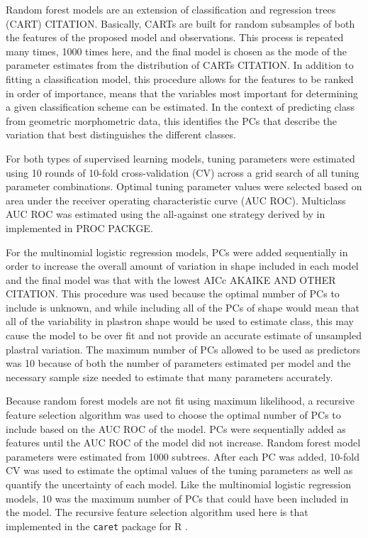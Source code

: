 \documentclass[12pt]{article}\usepackage{graphicx, color}
\begin{document}
Random forest models are an extension of classification and regression trees (CART) CITATION. Basically, CARTs are built for random subsamples of both the features of the proposed model and observations. This process is repeated many times, 1000 times here, and the final model is chosen as the mode of the parameter estimates from the distribution of CARTs CITATION. In addition to fitting a classification model, this procedure allows for the features to be ranked in order of importance, means that the variables most important for determining a given classification scheme can be estimated. In the context of predicting class from geometric morphometric data, this identifies the PCs that describe the variation that best distinguishes the different classes.


For both types of supervised learning models, tuning parameters were estimated using 10 rounds of 10-fold cross-validation (CV) across a grid search of all tuning parameter combinations. Optimal tuning parameter values were selected based on area under the receiver operating characteristic curve (AUC ROC). Multiclass AUC ROC was estimated using the all-against one strategy derived by \citet{Hand2001} in implemented in PROC PACKGE.

For the multinomial logistic regression models, PCs were added sequentially in order to increase the overall amount of variation in shape included in each model and the final model was that with the lowest AICc \citep{Burnham2002a} AKAIKE AND OTHER CITATION. This procedure was used because the optimal number of PCs to include is unknown, and while including all of the PCs of shape would mean that all of the variability in plastron shape would be used to estimate class, this may cause the model to be over fit and not provide an accurate estimate of unsampled plastral variation. The maximum number of PCs allowed to be used as predictors was 10 because of both the number of parameters estimated per model and the necessary sample size needed to estimate that many parameters accurately.

Because random forest models are not fit using maximum likelihood, a recursive feature selection algorithm was used to choose the optimal number of PCs to include based on the AUC ROC of the model. PCs were sequentially added as features until the AUC ROC of the model did not increase. Random forest model parameters were estimated from 1000 subtrees. After each PC was added, 10-fold CV was used to estimate the optimal values of the tuning parameters as well as quantify the uncertainty of each model. Like the multinomial logistic regression models, 10 was the maximum number of PCs that could have been included in the model. The recursive feature selection algorithm used here is that implemented in the \texttt{caret} package for R \citep{Kuhn2013}.
\end{document}
